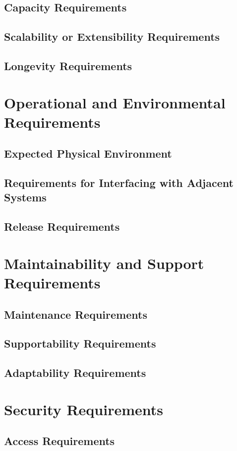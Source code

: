 \documentclass[12pt,a4paper]{article}
\begin{document}
\subsection{Capacity Requirements}
\subsection{Scalability or Extensibility Requirements}
\subsection{Longevity Requirements}
\pagebreak
\section{Operational and Environmental Requirements}
\subsection{Expected Physical Environment}
\subsection{Requirements for Interfacing with Adjacent Systems}
\subsection{Release Requirements}
\pagebreak
\section{Maintainability and Support Requirements}
\subsection{Maintenance Requirements}
\subsection{Supportability Requirements}
\subsection{Adaptability Requirements}
\pagebreak
\section{Security Requirements}
\subsection{Access Requirements}
\end{document}
